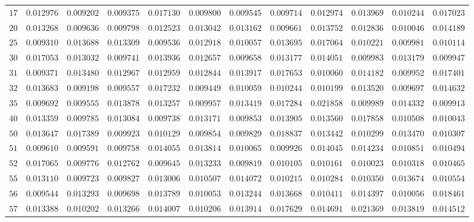 \begin{sidewaystable}
\begin{tabular}{r|rrrrrrrrrrr}
$17$ & $0.012976$ & $0.009202$ & $0.009375$ & $0.017130$ & $0.009800$ & $0.009545$ & $0.009714$ & $0.012974$ & $0.013969$ & $0.010244$ & $0.017023$ \\
$20$ & $0.013268$ & $0.009636$ & $0.009798$ & $0.012523$ & $0.013042$ & $0.013162$ & $0.009661$ & $0.013752$ & $0.012836$ & $0.010046$ & $0.014189$ \\
$25$ & $0.009310$ & $0.013688$ & $0.013309$ & $0.009536$ & $0.012918$ & $0.010057$ & $0.013695$ & $0.017064$ & $0.010221$ & $0.009981$ & $0.010114$ \\
$30$ & $0.017053$ & $0.013032$ & $0.009741$ & $0.013936$ & $0.012657$ & $0.009658$ & $0.013177$ & $0.014051$ & $0.009983$ & $0.013179$ & $0.009947$ \\
$31$ & $0.009371$ & $0.013480$ & $0.012967$ & $0.012959$ & $0.012844$ & $0.013917$ & $0.017653$ & $0.010060$ & $0.014182$ & $0.009952$ & $0.017401$ \\
$32$ & $0.013683$ & $0.009198$ & $0.009557$ & $0.017232$ & $0.009449$ & $0.010059$ & $0.010244$ & $0.010199$ & $0.013520$ & $0.009697$ & $0.014632$ \\
$35$ & $0.009692$ & $0.009555$ & $0.013878$ & $0.013257$ & $0.009957$ & $0.013419$ & $0.017284$ & $0.021858$ & $0.009989$ & $0.014332$ & $0.009913$ \\
$40$ & $0.013359$ & $0.009785$ & $0.013084$ & $0.009738$ & $0.013171$ & $0.009853$ & $0.013905$ & $0.013560$ & $0.017858$ & $0.010508$ & $0.010043$ \\
$50$ & $0.013647$ & $0.017389$ & $0.009923$ & $0.010129$ & $0.009854$ & $0.009829$ & $0.018837$ & $0.013442$ & $0.010299$ & $0.013470$ & $0.010307$ \\
$51$ & $0.009610$ & $0.009591$ & $0.009758$ & $0.014055$ & $0.013814$ & $0.010065$ & $0.009926$ & $0.014045$ & $0.014234$ & $0.010851$ & $0.010494$ \\
$52$ & $0.017065$ & $0.009776$ & $0.012762$ & $0.009645$ & $0.013233$ & $0.009819$ & $0.010105$ & $0.010161$ & $0.010023$ & $0.010318$ & $0.010465$ \\
$55$ & $0.013110$ & $0.009723$ & $0.009827$ & $0.013006$ & $0.010507$ & $0.014072$ & $0.010215$ & $0.010284$ & $0.010350$ & $0.013674$ & $0.010554$ \\
$56$ & $0.009544$ & $0.013293$ & $0.009698$ & $0.013789$ & $0.010053$ & $0.013244$ & $0.013668$ & $0.010411$ & $0.014397$ & $0.010056$ & $0.018461$ \\
$57$ & $0.013388$ & $0.010202$ & $0.013266$ & $0.014007$ & $0.010206$ & $0.013914$ & $0.017629$ & $0.014691$ & $0.021369$ & $0.013819$ & $0.014512$ \\

\end{tabular}
\end{sidewaystable}

